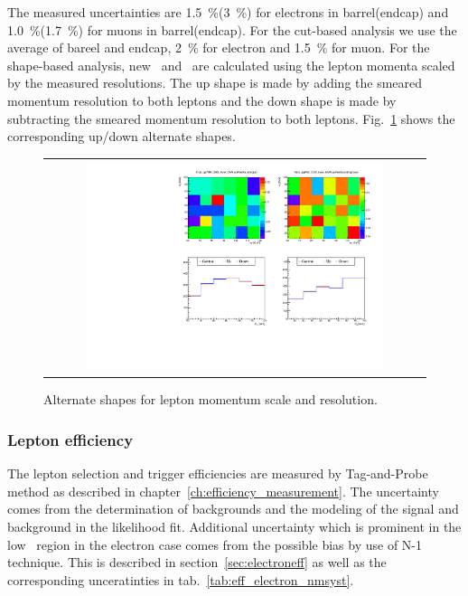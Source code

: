 The measured uncertainties are 1.5~\%(3~\%) for electrons in barrel(endcap)  
and 1.0~\%(1.7~\%) for muons in barrel(endcap). For the cut-based analysis
we use the average of bareel and endcap, 2~\% for electron and 1.5~\% for muon. 
For the shape-based analysis, new \mT\ and \mll\ are calculated using the 
lepton momenta scaled by the measured resolutions.
The up shape is made by adding the smeared momentum resolution to both leptons
and the down shape is made by subtracting the smeared momentum resolution to both leptons.
Fig.~\ref{fig:alter_lepres} shows the corresponding up/down alternate shapes. 
%
\begin{figure}[htp]
\centering
\begin{tabular}{c}
\includegraphics[width=0.8\textwidth]{figures/histo_qqWW_CMS_hww_MVALepResBounding_0j_zoom.pdf}
\end{tabular}
\caption{Alternate shapes for lepton momentum scale and resolution.}
\label{fig:alter_lepres}
\end{figure}


\subsubsection{Lepton efficiency} 

The lepton selection and trigger efficiencies are measured by Tag-and-Probe method
as described in chapter~\ref{ch:efficiency_measurement}. The uncertainty comes from 
the determination of backgrounds and the modeling of the signal 
and background in the likelihood fit. Additional uncertainty which is 
prominent in the low \pt\ region in the electron case 
comes from the possible bias by use of N-1 technique. 
This is described in section~\ref{sec:electroneff} as well as the corresponding 
unceratinties in tab.~\ref{tab:eff_electron_nmsyst}.

